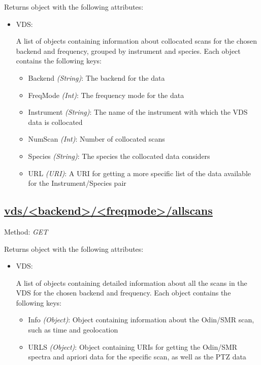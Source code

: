 Returns object with the following attributes:
\begin{itemize}
    \item VDS:

        A list of objects containing information about collocated scans for
        the chosen backend and frequency, grouped by instrument and species.
        Each object contains the following keys:

        \begin{itemize}
            \item Backend \emph{(String)}: The backend for the data
            \item FreqMode \emph{(Int)}: The frequency mode for the data
            \item Instrument \emph{(String)}: The name of the instrument with
                which the VDS data is collocated
            \item NumScan \emph{(Int)}: Number of collocated scans
            \item Species \emph{(String)}: The species the collocated data
                considers
            \item URL \emph{(URI)}: A URI for getting a more specific list of
                the data available for the Instrument/Species pair
        \end{itemize}
\end{itemize}


\subsection{\url{vds/<backend>/<freqmode>/allscans}}
Method: \emph{GET}

Returns object with the following attributes:
\begin{itemize}
    \item VDS:

        A list of objects containing detailed information about all the scans
        in the VDS for the chosen backend and frequency.
        Each object contains the following keys:

        \begin{itemize}
            \item Info \emph{(Object)}: Object containing information
                about the Odin/SMR scan, such as time and geolocation
            \item URLS \emph{(Object)}: Object containing URIs for getting the
                Odin/SMR spectra and apriori data for the specific scan, as
                well as the PTZ data
        \end{itemize}
\end{itemize}


